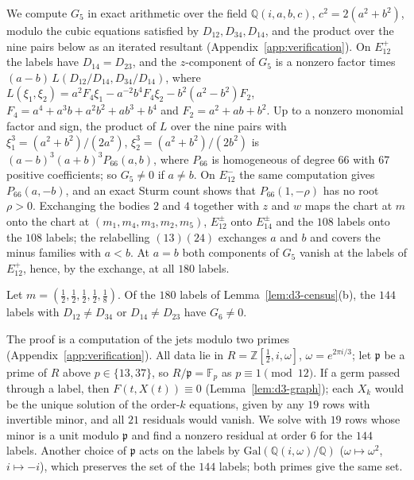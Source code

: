 We compute $G_5$ in exact arithmetic over the field $\mathbb Q(i,a,b,c)$, $c^2=2(a^2+b^2)$, modulo
the cubic equations satisfied by $D_{12},D_{34},D_{14}$, and the product over the nine pairs below
as an iterated resultant (Appendix~\ref{app:verification}).  On $E^+_{12}$ the labels have
$D_{14}=D_{23}$, and the $z$-component of $G_5$ is a nonzero factor
times $(a-b)\,L(D_{12}/D_{14},D_{34}/D_{14})$, where
$L(\xi_1,\xi_2)=a^2F_4\xi_1-a^{-2}b^4F_4\xi_2-b^2(a^2-b^2)F_2$,
$F_4=a^4+a^3b+a^2b^2+ab^3+b^4$ and $F_2=a^2+ab+b^2$.  Up to a nonzero monomial factor and sign,
the product of $L$ over the nine pairs with $\xi_1^3=(a^2+b^2)/(2a^2)$, $\xi_2^3=(a^2+b^2)/(2b^2)$
is $(a-b)^3(a+b)^3P_{66}(a,b)$, where $P_{66}$ is homogeneous of degree $66$ with $67$ positive
coefficients; so $G_5\ne0$ if $a\ne b$.
On $E^-_{12}$ the same computation gives $P_{66}(a,-b)$, and an exact Sturm count shows that
$P_{66}(1,-\rho)$ has no root $\rho>0$.  Exchanging the bodies $2$ and $4$ together with $z$ and
$w$ maps the chart at $m$ onto the chart at $(m_1,m_4,m_3,m_2,m_5)$, $E^\pm_{12}$ onto
$E^\pm_{14}$ and the $108$ labels onto the $108$ labels; the relabelling $(13)(24)$ exchanges $a$
and $b$ and covers the minus families with $a<b$.  At $a=b$ both components of $G_5$ vanish at
the labels of $E^+_{12}$, hence, by the exchange, at all $180$ labels.

\begin{lemma}\label{lem:d3-order6}
Let $m=(\frac12,\frac12,\frac12,\frac12,\frac18)$.  Of the $180$ labels of
Lemma~\ref{lem:d3-census}(b), the $144$ labels with $D_{12}\ne D_{34}$ or $D_{14}\ne D_{23}$ have
$G_6\neq0$.
\end{lemma}

The proof is a computation of the jets modulo two primes (Appendix~\ref{app:verification}).  All
data lie in $R=\mathbb Z[\frac12,i,\omega]$, $\omega=e^{2\pi i/3}$; let $\mathfrak p$ be a prime of
$R$ above $p\in\{13,37\}$, so $R/\mathfrak p=\mathbb F_p$ as $p\equiv1\pmod{12}$.  If a germ passed
through a label, then $F(t,X(t))\equiv0$ (Lemma~\ref{lem:d3-graph}); each $X_k$ would be the
unique solution of the order-$k$ equations, given by any $19$ rows with invertible minor, and all
$21$ residuals would vanish.  We solve with $19$ rows whose minor is a unit modulo $\mathfrak p$
and find a nonzero residual at order $6$ for the $144$ labels.  Another choice of $\mathfrak p$
acts on the labels by $\mathrm{Gal}(\mathbb Q(i,\omega)/\mathbb Q)$ ($\omega\mapsto\omega^2$,
$i\mapsto-i$), which preserves the set of the $144$ labels; both primes give the same set.

